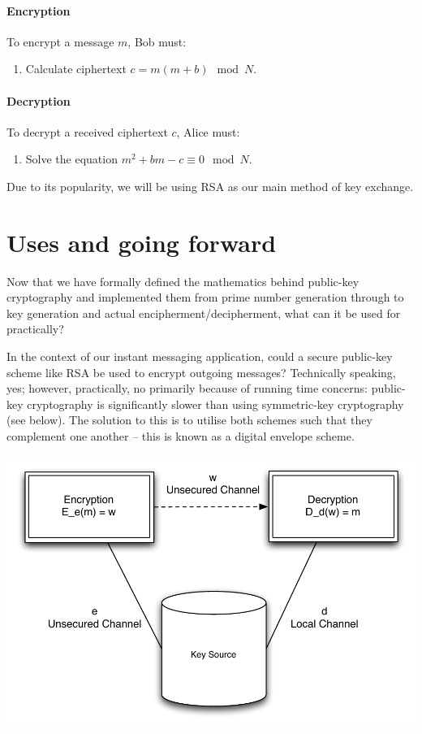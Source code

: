   \paragraph{Encryption}
  
  To encrypt a message $m$, Bob must:
  
  \begin{enumerate}
    \item Calculate ciphertext $c = m(m+b) \mod N$.
  \end{enumerate}
  
  \paragraph{Decryption}
  
  To decrypt a received ciphertext $c$, Alice must:
  
  \begin{enumerate}
    \item Solve the equation $m^2 + bm -c \equiv 0 \mod N$.
  \end{enumerate}
    
Due to its popularity, we will be using RSA as our main method of key exchange.

\section{Uses and going forward}

Now that we have formally defined the mathematics behind public-key cryptography and implemented them from prime number generation through to key generation and actual encipherment/decipherment, what can it be used for practically? 

In the context of our instant messaging application, could a secure public-key scheme like RSA be used to encrypt outgoing messages? Technically speaking, yes; however, practically, no primarily because of running time concerns: public-key cryptography is significantly slower than using symmetric-key cryptography (see below). The solution to this is to utilise both schemes such that they complement one another -- this is known as a digital envelope scheme.

\begin{center}
  \includegraphics[scale=0.6]{./Figures/3-7a.pdf}
\end{center}

